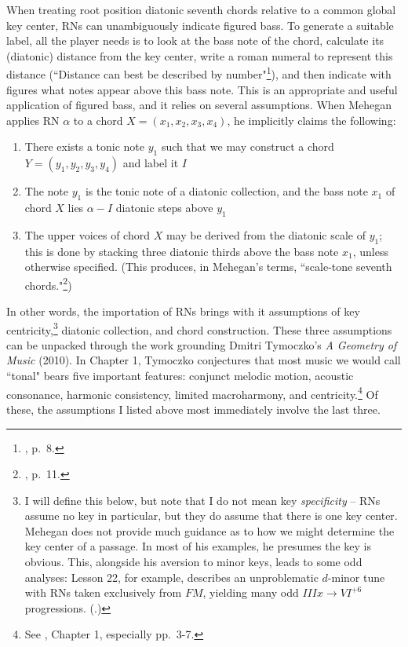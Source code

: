 When treating root position diatonic seventh chords relative to a common global key center, RNs can unambiguously indicate figured bass.  To generate a suitable label, all the player needs is to look at the bass note of the chord, calculate its (diatonic) distance from the key center, write a roman numeral to represent this distance (``Distance can best be described by number"\footnote{\cite{mehegan1959}, p.\ 8.}), and then indicate with figures what notes appear above this bass note.  This is an appropriate and useful application of figured bass, and it relies on several assumptions.  When Mehegan applies RN $\alpha$ to a chord $X = (x_1,x_2,x_3,x_4)$, he implicitly claims the following:\
\begin{enumerate}
	\item There exists a tonic note $y_1$ such that we may construct a chord $Y = (y_1,y_2,y_3,y_4)$ and label it $I$
	\item The note $y_1$ is the tonic note of a diatonic collection, and the bass note $x_1$ of chord $X$ lies $\alpha - I$ diatonic steps above $y_1$
	\item The upper voices of chord $X$ may be derived from the diatonic scale of $y_1$; this is done by stacking three diatonic thirds above the bass note $x_1$, unless otherwise specified.  (This produces, in Mehegan's terms, ``scale-tone seventh chords."\footnote{\cite{mehegan1959}, p.\ 11.})
\end{enumerate}
In other words, the importation of RNs brings with it assumptions of key centricity,\footnote{I will define this below, but note that I do not mean key \emph{specificity} -- RNs assume no key in particular, but they do assume that there is one key center. Mehegan does not provide much guidance as to how we might determine the key center of a passage.  In most of his examples, he presumes the key is obvious.  This, alongside his aversion to minor keys, leads to some odd analyses: Lesson 22, for example, describes an unproblematic $d$-minor tune with RNs taken exclusively from $FM$, yielding many odd $IIIx \rightarrow VI^{+6}$ progressions.  (\cite{mehegan1959}.)} diatonic collection, and chord construction.  These three assumptions can be unpacked through the work grounding Dmitri Tymoczko's \emph{A Geometry of Music} (2010).  In Chapter 1, Tymoczko conjectures that most music we would call ``tonal" bears five important features: conjunct melodic motion, acoustic consonance, harmonic consistency, limited macroharmony, and centricity.\footnote{See \cite{tymoczko2010}, Chapter 1, especially pp.\ 3-7.}  Of these, the assumptions I listed above most immediately involve the last three.

